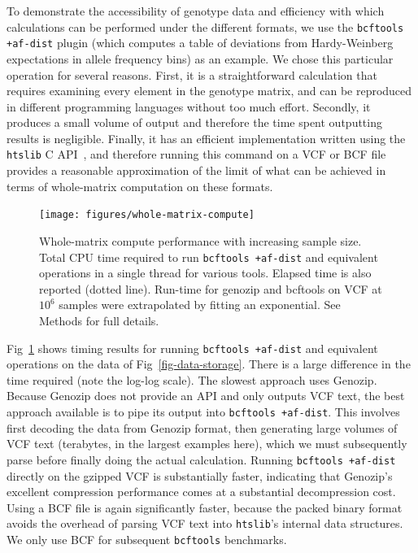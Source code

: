 \documentclass[a4paper,num-refs]{oup-contemporary}
\begin{document}
To demonstrate the accessibility of genotype data and efficiency with
which calculations can be performed under the different formats,
we use the \texttt{bcftools +af-dist} plugin
(which computes a table of
deviations from Hardy-Weinberg expectations in
allele frequency bins) as an example.
We chose this particular operation for several reasons.
First, it is a straightforward calculation that
requires examining every element in the genotype matrix,
and can be reproduced in different programming languages
without too much effort.
Secondly, it produces a small volume of output  and therefore the
time spent outputting results is negligible.
Finally, it has an efficient implementation written using the
\texttt{htslib} C API~\citep{bonfield2021htslib},
and therefore running this command on a VCF or BCF file provides
a reasonable approximation of the limit of what can be achieved in terms
of whole-matrix computation on these formats.

\begin{figure}
\texttt{[image: figures/whole-matrix-compute]}
\caption{Whole-matrix compute performance with increasing sample size.
Total CPU time required to run \texttt{bcftools +af-dist}
and equivalent operations in a single thread for various tools.
Elapsed time is also reported (dotted line). Run-time for genozip
and bcftools on VCF
at $10^6$ samples were extrapolated by fitting an exponential.
See Methods for full details.
\label{fig-whole-matrix-compute}}
\end{figure}

Fig~\ref{fig-whole-matrix-compute} shows timing results
for running \texttt{bcftools +af-dist} and equivalent operations
on the data of Fig~\ref{fig-data-storage}. There is a large
difference in the time required (note the log-log scale).
The slowest approach uses Genozip. Because Genozip does not
provide an API and only outputs VCF text, the best approach available
is to pipe its output into \texttt{bcftools +af-dist}.
This involves first decoding the data from Genozip format,
then generating large volumes  of VCF text (terabytes, in the
largest examples here), which we must
subsequently parse before finally doing the actual calculation.
Running \texttt{bcftools +af-dist} directly on the gzipped VCF
is substantially faster, indicating that Genozip's excellent
compression performance comes at a substantial decompression cost.
Using a BCF file is again significantly faster,
because the packed binary format avoids the overhead of parsing
VCF text into \texttt{htslib}'s internal data structures.
We only use BCF for subsequent \texttt{bcftools} benchmarks.
\end{document}
